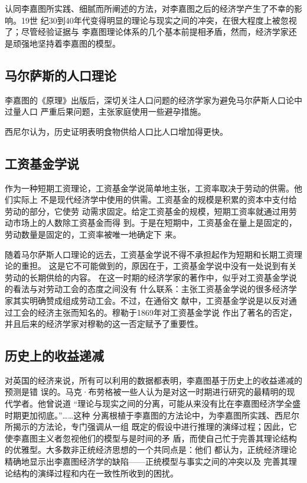 认同李嘉图所实践、细腻而所阐述的方法，对李嘉图之后的经济学产生了不幸的影响。19世
纪30到40年代变得明显的理论与现实之间的冲突，在很大程度上被忽视了；尽管经验证据与
李嘉图理论体系的几个基本前提相矛盾，然而，经济学家还是顽强地坚持着李嘉图的模型。

\subsection{马尔萨斯的人口理论}

李嘉图的《原理》出版后，深切关注人口问题的经济学家为避免马尔萨斯人口论中过量人口
严重后果问题，主张家庭使用一些避孕措施。

西尼尔认为，历史证明表明食物供给人口比人口增加得更快。

\subsection{工资基金学说}

作为一种短期工资理论，工资基金学说简单地主张，工资率取决于劳动的供需。他们实际上
不是现代经济学中使用的供需。工资基金的规模是积累的资本中支付给劳动的部分，它使劳
动需求固定。给定工资基金的规模，短期工资率就通过用劳动市场上的人数除工资基金而得
到。于是在短期中，工资基金在量上是固定的，劳动数量是固定的，工资率被唯一地确定下
来。

随着马尔萨斯人口理论的远去，工资基金学说不得不承担起作为短期和长期工资理论的重担。
这是它不可能做到的，原因在于，工资基金学说中没有一处说到有关劳动的长期供给的内容。
在这一时期的经济学家的著作中，似乎对工资基金学说的看法与对劳动工会的态度之间没有
什么联系：主张工资基金学说的很多经济学家其实明确赞成组成劳动工会。不过，在通俗文
献中，工资基金学说是以反对通过工会的经济主张而知名的。穆勒于1869年对工资基金学说
作出了著名的否定，并且后来的经济学家对穆勒的这一否定赋予了重要性。

\subsection{历史上的收益递减}

对英国的经济来说，所有可以利用的数据都表明，李嘉图基于历史上的收益递减的预测是错
误的。马克·布劳格被一些人认为是对这一时期进行研究的最精明的现代学者。他曾说道
“理论与现实之间的分离，可能从来没有比在李嘉图经济学全盛时期更加彻底。”……这种
分离根植于李嘉图的方法论中，为李嘉图所实践、西尼尔所揭示的方法论，专门强调从一组
既定的假设中进行推理的演绎过程；因此，它使李嘉图主义者忽视他们的模型与是时间的矛
盾，而使自己忙于完善其理论结构的优雅型。大多数非正统经济思想的一个共同点是：他们
都认为，正统经济理论精确地显示出李嘉图经济学的缺陷——正统模型与事实之间的冲突以及
完善其理论结构的演绎过程和内在一致性所收到的困扰。

